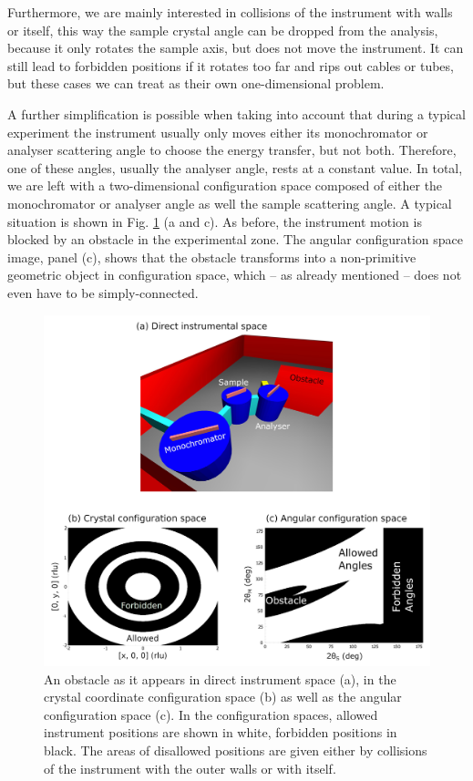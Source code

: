 Furthermore, we are mainly interested in collisions of the instrument with walls 
or itself, this way the sample crystal angle can be dropped from the analysis, 
because it only rotates the sample axis, but does not move the instrument. 
It can still lead to forbidden positions if it rotates too far and rips out cables 
or tubes, but these cases we can treat as their own one-dimensional problem. 

A further simplification is possible when taking into account that during a 
typical experiment the instrument usually only moves either its monochromator 
or analyser scattering angle to choose the energy transfer, but not both. 
Therefore, one of these angles, usually the analyser angle, rests at a constant 
value. In total, we are left with a two-dimensional configuration space composed 
of either the monochromator or analyser angle as well the sample scattering angle. 
A typical situation is shown in Fig. \ref{fig:tas_wall} (a and c). 
As before, the instrument motion is blocked by an obstacle in the experimental zone. 
The angular configuration space image, panel (c), shows that the obstacle 
transforms into a non-primitive geometric object in configuration space, 
which -- as already mentioned -- does not even have to be simply-connected.

\begin{figure}[htb]
	\centering
	\includegraphics[width = 0.95 \textwidth]{figures/tas_wall.jpg}
	\caption[TAS configuration spaces.]{
		An obstacle as it appears in direct instrument space (a), in the 
		crystal coordinate configuration space (b) as well as the angular
		configuration space (c).
		In the configuration spaces, allowed instrument positions are 
		shown in white, forbidden positions in black. 
		The areas of disallowed positions are given either by collisions 
		of the instrument with the outer walls or with itself.}
	\label{fig:tas_wall}
\end{figure}


